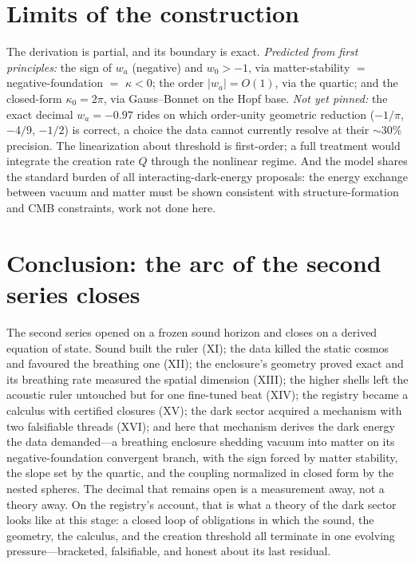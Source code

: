 \documentclass[11pt]{article}
\theoremstyle{remark}
\begin{document}
\section{Limits of the construction}
\label{sec:limits}
The derivation is partial, and its boundary is exact. \emph{Predicted from first principles:} the sign of $w_a$ (negative) and $w_0 > -1$, via matter-stability $=$ negative-foundation $=$ $\kappa < 0$; the order $|w_a| = O(1)$, via the quartic; and the closed-form $\kappa_0 = 2\pi$, via Gauss--Bonnet on the Hopf base. \emph{Not yet pinned:} the exact decimal $w_a = -0.97$ rides on which order-unity geometric reduction ($-1/\pi$, $-4/9$, $-1/2$) is correct, a choice the data cannot currently resolve at their $\sim 30\%$ precision. The linearization about threshold is first-order; a full treatment would integrate the creation rate $Q$ through the nonlinear regime. And the model shares the standard burden of all interacting-dark-energy proposals: the energy exchange between vacuum and matter must be shown consistent with structure-formation and CMB constraints, work not done here.

\section{Conclusion: the arc of the second series closes}
\label{sec:conclusion}
The second series opened on a frozen sound horizon and closes on a derived equation of state. Sound built the ruler (XI); the data killed the static cosmos and favoured the breathing one (XII); the enclosure's geometry proved exact and its breathing rate measured the spatial dimension (XIII); the higher shells left the acoustic ruler untouched but for one fine-tuned beat (XIV); the registry became a calculus with certified closures (XV); the dark sector acquired a mechanism with two falsifiable threads (XVI); and here that mechanism derives the dark energy the data demanded---a breathing enclosure shedding vacuum into matter on its negative-foundation convergent branch, with the sign forced by matter stability, the slope set by the quartic, and the coupling normalized in closed form by the nested spheres. The decimal that remains open is a measurement away, not a theory away. On the registry's account, that is what a theory of the dark sector looks like at this stage: a closed loop of obligations in which the sound, the geometry, the calculus, and the creation threshold all terminate in one evolving pressure---bracketed, falsifiable, and honest about its last residual.
\end{document}
